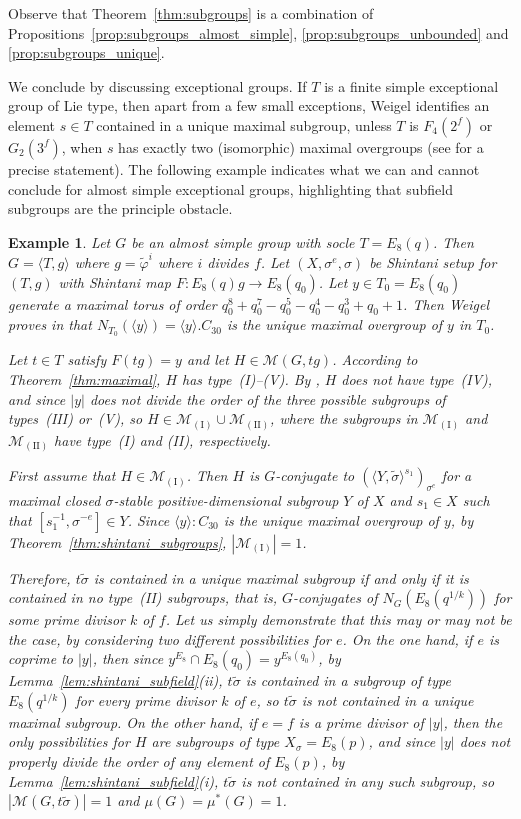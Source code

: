 \documentclass[11pt]{article}
\numberwithin{equation}{section}
\theoremstyle{shdefinition}
\newtheorem{example}[definition]{Example}
\theoremstyle{shplain}
\renewcommand{\wp}{\widetilde{\varphi}}
\newcommand{\s}{\sigma}
\newcommand{\ws}{\widetilde{\sigma}}
\newcommand{\M}{\mathcal{M}}
\newcommand{\<}{\langle}
\renewcommand{\>}{\rangle}
\renewcommand{\:}{\colon}
\begin{document}
Observe that Theorem~\ref{thm:subgroups} is a combination of Propositions~\ref{prop:subgroups_almost_simple}, \ref{prop:subgroups_unbounded} and \ref{prop:subgroups_unique}.

We conclude by discussing exceptional groups. If $T$ is a finite simple exceptional group of Lie type, then apart from a few small exceptions, Weigel \cite[Section~3]{ref:Weigel92} identifies an element $s \in T$ contained in a unique maximal subgroup, unless $T$ is $F_4(2^f)$ or $G_2(3^f)$, when $s$ has exactly two (isomorphic) maximal overgroups (see \cite[Theorem~5.1]{ref:BurnessHarper19} for a precise statement). The following example indicates what we can and cannot conclude for almost simple exceptional groups, highlighting that subfield subgroups are the principle obstacle.

\begin{example} \label{ex:subgroups_exceptional}
Let $G$ be an almost simple group with socle $T = E_8(q)$. Then $G = \< T, g \>$ where $g = \wp^i$ where $i$ divides $f$. Let $(X,\s^e,\s)$ be Shintani setup for $(T,g)$ with Shintani map $F\:E_8(q)g \to E_8(q_0)$. Let $y \in T_0 = E_8(q_0)$ generate a maximal torus of order $q_0^8+q_0^7-q_0^5-q_0^4-q_0^3+q_0+1$. Then Weigel proves in \cite[Section~3(j)]{ref:Weigel92} that $N_{T_0}(\<y\>) = \<y\>.C_{30}$ is the unique maximal overgroup of $y$ in $T_0$.

Let $t \in T$ satisfy $F(tg) = y$ and let $H \in \M(G,tg)$. According to Theorem~\ref{thm:maximal}, $H$ has type~(I)--(V). By \cite[Proposition~5.1]{ref:BurnessGuralnickHarper}, $H$ does not have type~(IV), and since $|y|$ does not divide the order of the three possible subgroups of types~(III) or~(V), so $H \in \M_{\mathrm{(I)}} \cup \M_{\mathrm{(II)}}$, where the subgroups in $\M_{\mathrm{(I)}}$ and $\M_{\mathrm{(II)}}$ have type~(I) and (II), respectively.

First assume that $H \in \M_{\mathrm{(I)}}$. Then $H$ is $G$-conjugate to $(\<Y, \ws\>^{s_1})_{\s^e}$ for a maximal closed $\s$-stable positive-dimensional subgroup $Y$ of $X$ and $s_1 \in X$ such that $[s_1^{-1},\s^{-e}] \in Y$. Since $\<y\>{:}C_{30}$ is the unique maximal overgroup of $y$, by Theorem~\ref{thm:shintani_subgroups}, $|\M_{\mathrm{(I)}}|=1$.

Therefore, $t\ws$ is contained in a unique maximal subgroup if and only if it is contained in no type~(II) subgroups, that is, $G$-conjugates of $N_G(E_8(q^{1/k}))$ for some prime divisor $k$ of $f$. Let us simply demonstrate that this may or may not be the case, by considering two different possibilities for $e$. On the one hand, if $e$ is coprime to $|y|$, then since $y^{E_8} \cap E_8(q_0) = y^{E_8(q_0)}$, by Lemma~\ref{lem:shintani_subfield}(ii), $t\ws$ is contained in a subgroup of type $E_8(q^{1/k})$ for every prime divisor $k$ of $e$, so $t\ws$ is not contained in a unique maximal subgroup. On the other hand, if $e=f$ is a prime divisor of $|y|$, then the only possibilities for $H$ are subgroups of type $X_\s = E_8(p)$, and since $|y|$ does not properly divide the order of any element of $E_8(p)$, by Lemma~\ref{lem:shintani_subfield}(i), $t\ws$ is not contained in any such subgroup, so $|\M(G,t\ws)|=1$ and $\mu(G)=\mu^*(G)=1$.
\end{example}
\end{document}
